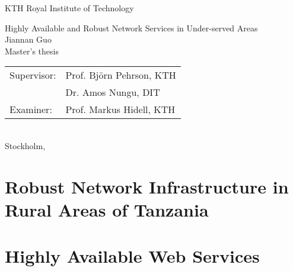 \documentclass[a4paper,11pt]{report}
\author{Jiannan Guo}
\begin{document}
\begin{titlepage}
\thispagestyle{empty}

\begin{center}
  \vspace{0.5cm}
  \Large{\sc KTH Royal Institute of Technology}\\
  \vspace{3cm}

  \vspace{0.5cm}
  \Large{Highly Available and Robust Network Services in Under-served Areas}\\
  \vspace{2cm}  
  \large{\sc Jiannan Guo}\\
  \vspace{3cm}
  Master's thesis\\
  \vspace{0.5cm}
  \begin{tabular}{ll} 
    Supervisor: & Prof. Bj\"{o}rn Pehrson, KTH\\
    & Dr. Amos Nungu, DIT\\		
	Examiner:  & Prof. Markus Hidell, KTH\\ 
  \end{tabular}
  \vspace{1cm}
  \\Stockholm, \\
\end{center} 

\end{titlepage}

\pagestyle{plain}
%

\cleardoublepage
{}
\pagestyle{fancy}

\part{Robust Network Infrastructure in Rural Areas of Tanzania}

\part{Highly Available Web Services}






\cleardoublepage
{}
{}



%
\end{document}
